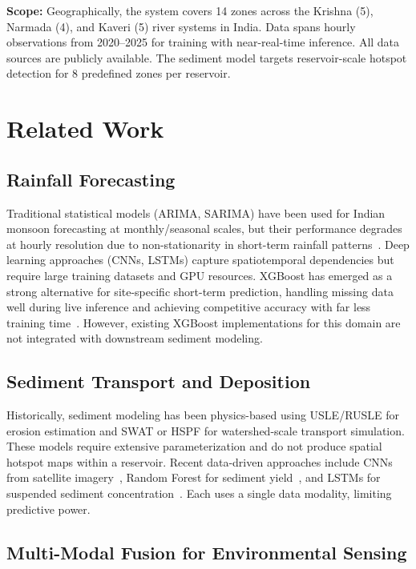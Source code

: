 \documentclass[twocolumn]{article}
\begin{document}
\textbf{Scope:}
Geographically, the system covers 14 zones across the Krishna (5), Narmada (4), and Kaveri (5) river systems in India. Data spans hourly observations from 2020--2025 for training with near-real-time inference. All data sources are publicly available. The sediment model targets reservoir-scale hotspot detection for 8 predefined zones per reservoir.

\section{Related Work}

\subsection{Rainfall Forecasting}

Traditional statistical models (ARIMA, SARIMA) have been used for Indian monsoon forecasting at monthly/seasonal scales, but their performance degrades at hourly resolution due to non-stationarity in short-term rainfall patterns~\cite{poonia2022}. Deep learning approaches (CNNs, LSTMs) capture spatiotemporal dependencies but require large training datasets and GPU resources. XGBoost has emerged as a strong alternative for site-specific short-term prediction, handling missing data well during live inference and achieving competitive accuracy with far less training time~\cite{kashiwao2017, lana2018}. However, existing XGBoost implementations for this domain are not integrated with downstream sediment modeling.

\subsection{Sediment Transport and Deposition}

Historically, sediment modeling has been physics-based using USLE/RUSLE for erosion estimation and SWAT or HSPF for watershed-scale transport simulation. These models require extensive parameterization and do not produce spatial hotspot maps within a reservoir. Recent data-driven approaches include CNNs from satellite imagery~\cite{chen2019}, Random Forest for sediment yield~\cite{ghebleh2021}, and LSTMs for suspended sediment concentration~\cite{fang2020}. Each uses a single data modality, limiting predictive power.

\subsection{Multi-Modal Fusion for Environmental Sensing}
\end{document}
